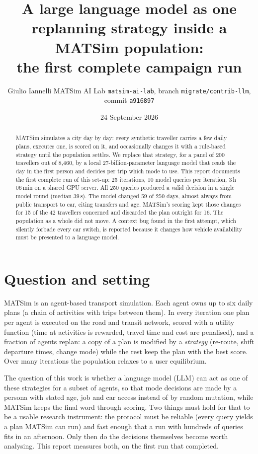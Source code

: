 \documentclass[10pt,a4paper]{article}
\title{\vspace{-1.2cm}\Large A large language model as one replanning strategy inside a MATSim population:\\the first complete campaign run}
\author{\normalsize Giulio Iannelli \quad MATSim AI Lab \quad \texttt{matsim-ai-lab}, branch \texttt{migrate/contrib-llm}, commit \texttt{a916897}}
\date{\normalsize 24 September 2026}
\begin{document}
\maketitle\vspace{-0.9cm}

\begin{abstract}\noindent
MATSim simulates a city day by day: every synthetic traveller carries a few daily plans, executes one, is scored on it, and occasionally changes it with a rule-based strategy until the population settles. We replace that strategy, for a panel of 200 travellers out of 8,460, by a local 27-billion-parameter language model that reads the day in the first person and decides per trip which mode to use. This report documents the first complete run of this set-up: 25 iterations, 10 model queries per iteration, 3\,h\,06\,min on a shared GPU server. All 250 queries produced a valid decision in a single model round (median 39\,s). The model changed 59 of 250 days, almost always from public transport to car, citing transfers and age. MATSim's scoring kept those changes for 15 of the 42 travellers concerned and discarded the plan outright for 16. The population as a whole did not move. A context bug found in the first attempt, which silently forbade every car switch, is reported because it changes how vehicle availability must be presented to a language model.
\end{abstract}

\section{Question and setting}
MATSim is an agent-based transport simulation. Each agent owns up to six daily plans (a chain of activities with trips between them). In every iteration one plan per agent is executed on the road and transit network, scored with a utility function (time at activities is rewarded, travel time and cost are penalised), and a fraction of agents replan: a copy of a plan is modified by a \emph{strategy} (re-route, shift departure times, change mode) while the rest keep the plan with the best score. Over many iterations the population relaxes to a user equilibrium.

The question of this work is whether a language model (LLM) can act as one of these strategies for a subset of agents, so that mode decisions are made by a persona with stated age, job and car access instead of by random mutation, while MATSim keeps the final word through scoring. Two things must hold for that to be a usable research instrument: the protocol must be reliable (every query yields a plan MATSim can run) and fast enough that a run with hundreds of queries fits in an afternoon. Only then do the decisions themselves become worth analysing. This report measures both, on the first run that completed.
\end{document}
